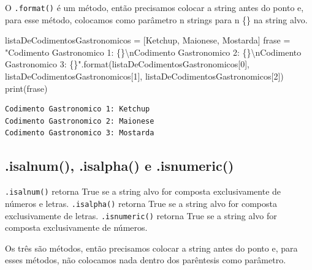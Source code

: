 \documentclass[
  letterpaper,
  DIV=11,
  numbers=noendperiod]{scrreprt}
\newenvironment{Shaded}{\begin{snugshade}}{\end{snugshade}}
\newcommand{\BuiltInTok}[1]{\textcolor[rgb]{0.00,0.23,0.31}{#1}}
\newcommand{\CharTok}[1]{\textcolor[rgb]{0.13,0.47,0.30}{#1}}
\newcommand{\DecValTok}[1]{\textcolor[rgb]{0.68,0.00,0.00}{#1}}
\newcommand{\NormalTok}[1]{\textcolor[rgb]{0.00,0.23,0.31}{#1}}
\newcommand{\OperatorTok}[1]{\textcolor[rgb]{0.37,0.37,0.37}{#1}}
\newcommand{\SpecialCharTok}[1]{\textcolor[rgb]{0.37,0.37,0.37}{#1}}
\newcommand{\StringTok}[1]{\textcolor[rgb]{0.13,0.47,0.30}{#1}}
\begin{document}
O \texttt{.format()} é um método, então precisamos colocar a string
antes do ponto e, para esse método, colocamos como parâmetro n strings
para n \{\} na string alvo.

\begin{Shaded}
\begin{Highlighting}[]
\NormalTok{listaDeCodimentosGastronomicos }\OperatorTok{=}\NormalTok{ [}\StringTok{\textquotesingle{}Ketchup\textquotesingle{}}\NormalTok{, }\StringTok{\textquotesingle{}Maionese\textquotesingle{}}\NormalTok{, }\StringTok{\textquotesingle{}Mostarda\textquotesingle{}}\NormalTok{]}
\NormalTok{frase }\OperatorTok{=} \StringTok{"Codimento Gastronomico 1: }\SpecialCharTok{\{\}}\CharTok{\textbackslash{}n}\StringTok{Codimento Gastronomico 2: }\SpecialCharTok{\{\}}\CharTok{\textbackslash{}n}\StringTok{Codimento Gastronomico 3: }\SpecialCharTok{\{\}}\StringTok{"}\NormalTok{.}\BuiltInTok{format}\NormalTok{(listaDeCodimentosGastronomicos[}\DecValTok{0}\NormalTok{], listaDeCodimentosGastronomicos[}\DecValTok{1}\NormalTok{], listaDeCodimentosGastronomicos[}\DecValTok{2}\NormalTok{])}
\BuiltInTok{print}\NormalTok{(frase)}
\end{Highlighting}
\end{Shaded}

\begin{tcolorbox}[enhanced jigsaw, breakable, leftrule=.75mm, left=2mm, opacityback=0, bottomrule=.15mm, toprule=.15mm, rightrule=.15mm, arc=.35mm, colback=white]

\begin{verbatim}
Codimento Gastronomico 1: Ketchup
Codimento Gastronomico 2: Maionese
Codimento Gastronomico 3: Mostarda
\end{verbatim}

\end{tcolorbox}

\hypertarget{isalnum-.isalpha-e-.isnumeric}{%
\subsection{.isalnum(), .isalpha() e
.isnumeric()}\label{isalnum-.isalpha-e-.isnumeric}}

\texttt{.isalnum()} retorna True se a string alvo for composta
exclusivamente de números e letras. \texttt{.isalpha()} retorna True se
a string alvo for composta exclusivamente de letras.
\texttt{.isnumeric()} retorna True se a string alvo for composta
exclusivamente de números.

Os três são métodos, então precisamos colocar a string antes do ponto e,
para esses métodos, não colocamos nada dentro dos parêntesis como
parâmetro.
\end{document}
